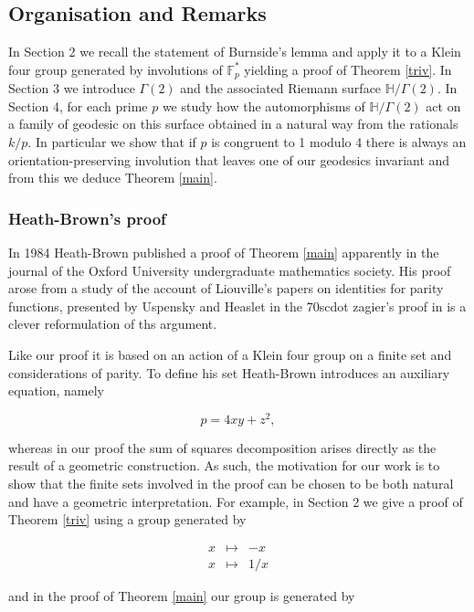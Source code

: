 \documentclass[12pt,a4paper]{amsart}
\def\HH{\mathbb{H}}
\def\xx{\HH/g2}
\def\fp{\mathbb{F}_p}
\def\g2{\Gamma(2)}
\def\xx{\HH/\g2}
\begin{document}
\subsection{Organisation and Remarks}

In Section 2 we recall the statement of Burnside's lemma 
and apply it to a Klein four group generated by involutions of $\fp^*$
yielding a proof of Theorem \ref{triv}. In Section 3 we introduce $\g2$
and the associated Riemann surface $\xx$. 
In Section 4, for each prime $p$
we study how the automorphisms of $\xx$ 
act on a family of geodesic on this surface
obtained in a natural way from the rationals $k/p$.
In particular we show 
that if $p$ is congruent to 1 modulo 4
there is always an orientation-preserving involution that
leaves one of our geodesics invariant
and from this we deduce Theorem \ref{main}.

\subsubsection{Heath-Brown's proof}

In 1984 Heath-Brown published a proof \cite{heath}
	 of Theorem \ref{main}
apparently  in the journal of the Oxford University undergraduate mathematics society. 
His proof arose from a study of the account of Liouville’s papers on identities for parity functions, presented  by Uspensky and Heaslet in the 70scdot zagier's proof in \cite{zagier} is a clever reformulation of ths argument.

Like our  proof it is based on an action of a Klein four group on a
finite set and considerations of parity. To define his set
Heath-Brown introduces an auxiliary equation, namely 

$$p = 4xy + z^2,$$ 

whereas in our proof the sum of squares decomposition arises
directly as the  result of a geometric construction. As such, the
motivation for our work is to show that the finite sets involved in
the proof can be chosen to be both natural and have a geometric
interpretation. For example, in Section 2 we give a proof of Theorem
\ref{triv} using a group generated by 


$$ \begin{array}{lll} x
&\mapsto& -x \\ x &\mapsto& 1/x \end{array} $$

and in the proof of Theorem \ref{main} our group is generated by 
\end{document}
